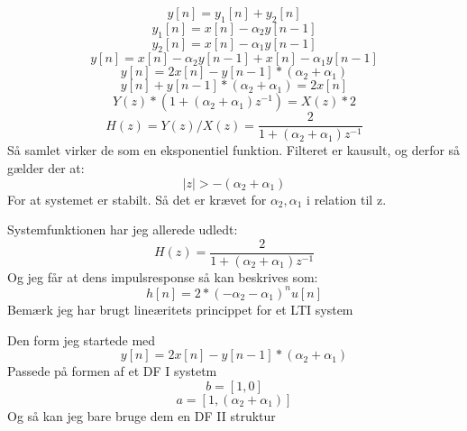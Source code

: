 \begin{rubrik}
\begin{eksamensOpgave}
\begin{UnderOpgave}
        \end{UnderOpgave}
        \[y[n] = y_1[n] + y_2[n]\]
        \[y_1[n] = x[n] - \alpha_2y[n - 1]\]
        \[y_2[n] = x[n] - \alpha_1y[n - 1]\]
        \[y[n] = x[n] - \alpha_2y[n - 1] + x[n] - \alpha_1y[n - 1]\]
        \[y[n] = 2x[n] - y[n - 1] * (\alpha_2 + \alpha_1)\]
        \[y[n] + y[n - 1] * (\alpha_2 + \alpha_1) = 2x[n]\]
        \[Y(z) * (1 + (\alpha_2 + \alpha_1)z^{-1}) = X(z)*2\]
        \[H(z) = Y(z)/X(z) = \frac{2}{1 + (\alpha_2 + \alpha_1)z^{-1}}\]
        Så samlet virker de som en eksponentiel funktion. Filteret er kausult, og derfor så gælder der at: 
        \[|z| > - (\alpha_2 + \alpha_1)\]
        For at systemet er stabilt. Så det er krævet for $\alpha_2, \alpha_1$ i relation til z.
        \begin{UnderOpgave}
            Systemfunktionen har jeg allerede udledt: 
            \[H(z) = \frac{2}{1 + (\alpha_2 + \alpha_1)z^{-1}}\]
            Og jeg får at dens impulsresponse så kan beskrives som: 
            \[h[n] = 2 * (- \alpha_2 - \alpha_1)^nu[n]\]
            Bemærk jeg har brugt lineæritets princippet for et LTI system
        \end{UnderOpgave}
        \begin{UnderOpgave}
            Den form jeg startede med
            \[y[n] = 2x[n] - y[n - 1] * (\alpha_2 + \alpha_1)\]
            Passede på formen af et DF I systetm
            \[b = [1, 0]\]
            \[a = [1, (\alpha_2 + \alpha_1)]\]
            Og så kan jeg bare bruge dem en DF II struktur
            \\


\end{UnderOpgave}
\end{eksamensOpgave}
\end{rubrik}
